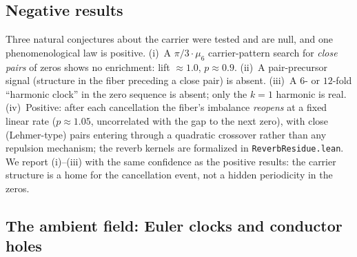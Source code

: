 \documentclass[11pt]{article}
\newcommand{\code}[1]{\texttt{#1}}
\begin{document}
\subsection{Negative results}\label{sub:nulls}

Three natural conjectures about the carrier were tested and are null, and one phenomenological law
is positive.  (i)~A $\pi/3\cdot\mu_6$ carrier-pattern search for \emph{close pairs} of zeros shows
no enrichment: lift $\approx1.0$, $p\approx0.9$.  (ii)~A pair-precursor signal (structure in the
fiber preceding a close pair) is absent.  (iii)~A $6$- or $12$-fold ``harmonic clock'' in the
zero sequence is absent; only the $k=1$ harmonic is real.  (iv)~Positive: after each cancellation
the fiber's imbalance \emph{reopens} at a fixed linear rate ($p\approx1.05$, uncorrelated with the
gap to the next zero), with close (Lehmer-type) pairs entering through a quadratic crossover rather
than any repulsion mechanism; the reverb kernels are formalized in
\code{ReverbResidue.lean}.  We report (i)--(iii) with the same confidence as the positive results:
the carrier structure is a home for the cancellation event, not a hidden periodicity in the zeros.

\subsection{The ambient field: Euler clocks and conductor holes}\label{sub:ambient}
\end{document}
